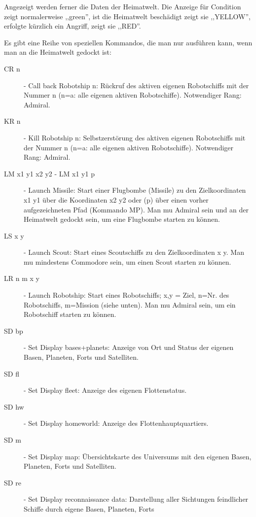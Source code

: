 Angezeigt werden ferner die Daten der Heimatwelt. Die Anzeige f\"ur Condition
zeigt normalerweise ,,green'', ist die Heimatwelt besch\"adigt 
zeigt sie ,,YELLOW'', erfolgte k\"urzlich ein Angriff, zeigt sie ,,RED''.

Es gibt eine Reihe von speziellen Kommandos, die man nur ausf\"uhren kann, wenn
man an die Heimatwelt gedockt ist:

\begin{description}
\item [CR n] - Call back Robotship n: R\"uckruf des aktiven eigenen 
               Robotschiffs mit der Nummer n (n=a: alle eigenen aktiven
               Robotschiffe). Notwendiger Rang: Admiral.
\item [KR n] - Kill Robotship n: Selbstzerst\"orung des aktiven eigenen 
               Robotschiffs mit der Nummer n (n=a: alle eigenen aktiven
               Robotschiffe). Notwendiger Rang: Admiral.
\item [LM x1 y1 x2 y2 -  LM x1 y1 p] - Launch Missile: Start einer Flugbombe 
                (Missile) zu den Zielkoordinaten
                x1 y1 \"uber die Koordinaten x2 y2 oder (p) \"uber einen vorher
                aufgezeichneten Pfad (Kommando MP).  
                Man mu\3 Admiral sein und an der Heimatwelt gedockt sein, 
                um eine Flugbombe starten zu k\"onnen.
\item [LS x y] - Launch Scout: Start eines Scoutschiffs 
                zu den Zielkoordinaten
                x y. Man mu\3 mindestens Commodore sein, um einen Scout
                starten zu k\"onnen.
\item [LR n m x y] - Launch Robotship: Start eines Robotschiffs; x,y = Ziel,
                n=Nr. des Robotschiffs, m=Mission (siehe unten).
                Man mu\3 Admiral sein, um ein Robotschiff starten zu k\"onnen.
\item [SD bp] - Set Display bases+planets: Anzeige von Ort und Status der
                eigenen Basen, Planeten, Forts und Satelliten.
\item [SD fl] - Set Display fleet: Anzeige des eigenen Flottenstatus.
\item [SD hw] - Set Display homeworld: Anzeige des Flottenhauptquartiers.
\item [SD m] - Set Display map: \"Ubersichtskarte des Universums mit den
                eigenen Basen, Planeten, Forts und Satelliten.
\item [SD re] - Set Display reconnaissance data: Darstellung aller Sichtungen
                feindlicher Schiffe durch eigene Basen, Planeten, Forts 

\end{description}

